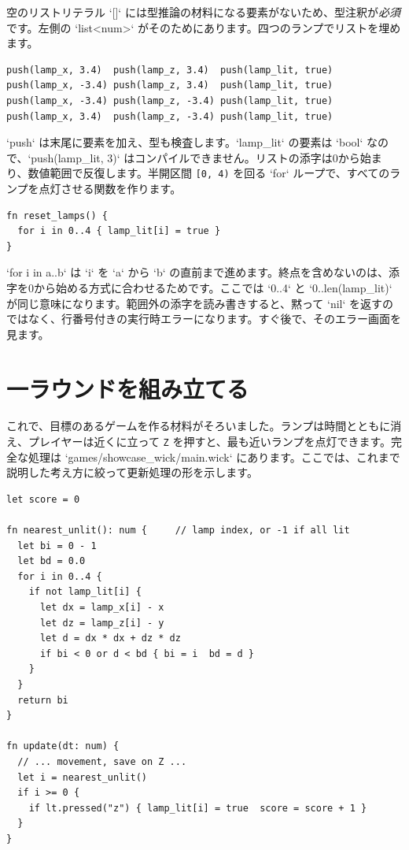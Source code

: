\noindent
空のリストリテラル `[]` には型推論の材料になる要素がないため、型注釈が\emph{必須}です。左側の `list<num>` がそのためにあります。四つのランプでリストを埋めます。

\begin{lstlisting}[language=wick]
push(lamp_x, 3.4)  push(lamp_z, 3.4)  push(lamp_lit, true)
push(lamp_x, -3.4) push(lamp_z, 3.4)  push(lamp_lit, true)
push(lamp_x, -3.4) push(lamp_z, -3.4) push(lamp_lit, true)
push(lamp_x, 3.4)  push(lamp_z, -3.4) push(lamp_lit, true)
\end{lstlisting}

\noindent
`push` は末尾に要素を加え、型も検査します。`lamp_lit` の要素は `bool` なので、`push(lamp_lit, 3)` はコンパイルできません。リストの添字は0から始まり、数値範囲で反復します。半開区間 \texttt{[0, 4)} を回る `for` ループで、すべてのランプを点灯させる関数を作ります。

\begin{lstlisting}[language=wick]
fn reset_lamps() {
  for i in 0..4 { lamp_lit[i] = true }
}
\end{lstlisting}

\noindent
`for i in a..b` は `i` を `a` から `b` の直前まで進めます。終点を含めないのは、添字を0から始める方式に合わせるためです。ここでは `0..4` と `0..len(lamp_lit)` が同じ意味になります。範囲外の添字を読み書きすると、黙って `nil` を返すのではなく、行番号付きの実行時エラーになります。すぐ後で、そのエラー画面を見ます。

\section{一ラウンドを組み立てる}

これで、目標のあるゲームを作る材料がそろいました。ランプは時間とともに消え、プレイヤーは近くに立って \texttt{Z} を押すと、最も近いランプを点灯できます。完全な処理は `games/showcase_wick/main.wick` にあります。ここでは、これまで説明した考え方に絞って更新処理の形を示します。

\begin{lstlisting}[language=wick]
let score = 0

fn nearest_unlit(): num {     // lamp index, or -1 if all lit
  let bi = 0 - 1
  let bd = 0.0
  for i in 0..4 {
    if not lamp_lit[i] {
      let dx = lamp_x[i] - x
      let dz = lamp_z[i] - y
      let d = dx * dx + dz * dz
      if bi < 0 or d < bd { bi = i  bd = d }
    }
  }
  return bi
}

fn update(dt: num) {
  // ... movement, save on Z ...
  let i = nearest_unlit()
  if i >= 0 {
    if lt.pressed("z") { lamp_lit[i] = true  score = score + 1 }
  }
}
\end{lstlisting}

